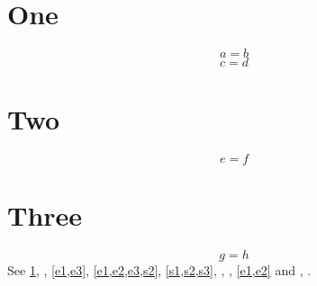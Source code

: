 \documentclass{article}
\begin{document}
\section{One}\label{s1}
\begin{equation}\label{e1}
a = b
\end{equation}
\begin{equation}\label{e2}
c = d
\end{equation}
\section{Two}\label{s2}
\begin{equation}\label{e3}
e = f
\end{equation}
\section{Three}\label{s3}
\begin{equation}\label{e4}
g = h
\end{equation}
See \cref{s1}, , \cref{e1,e3}, \cref{e1,e2,e3,s2}, \cref{s1,s2,s3}, , , \cref*{e1,e2} and , .
\end{document}
